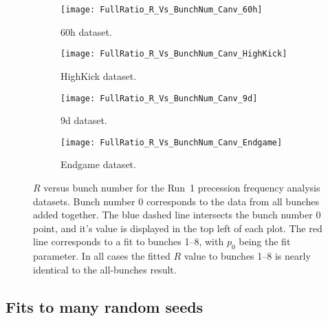 

\begin{figure}
\centering
    \begin{subfigure}[]{0.45\textwidth}
        \centering
        \texttt{[image: FullRatio\_R\_Vs\_BunchNum\_Canv\_60h]}
        \caption{60h dataset.}
    \end{subfigure}%
    \begin{subfigure}[]{0.45\textwidth}
        \centering
        \texttt{[image: FullRatio\_R\_Vs\_BunchNum\_Canv\_HighKick]}
        \caption{HighKick dataset.}
    \end{subfigure}

    \begin{subfigure}[]{0.45\textwidth}
        \centering
        \texttt{[image: FullRatio\_R\_Vs\_BunchNum\_Canv\_9d]}
        \caption{9d dataset.}
    \end{subfigure}%
    \begin{subfigure}[]{0.45\textwidth}
        \centering
        \texttt{[image: FullRatio\_R\_Vs\_BunchNum\_Canv\_Endgame]}
        \caption{Endgame dataset.}
    \end{subfigure}
\caption[$R$ versus bunch number]{$R$ versus bunch number for the Run~1 precession frequency analysis datasets. Bunch number 0 corresponds to the data from all bunches added together. The blue dashed line intersects the bunch number 0 point, and it's value is displayed in the top left of each plot. The red line corresponds to a fit to bunches 1--8, with $p_{0}$ being the fit parameter. In all cases the fitted $R$ value to bunches 1--8 is nearly identical to the all-bunches result.}
\label{fig:bunchNum_R}
\end{figure}


\clearpage


\subsection{Fits to many random seeds}
\label{sub:randomSeedFits}


